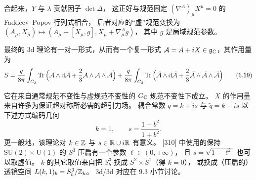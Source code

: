合起来，$Y$ 与 $\lambda$ 贡献因子 $\det\Delta$，
这正好与规范固定 $(\nabla^A)_\mu X^\mu=0$ 的 Faddeev--Popov 行列式相合，
后者对应的“虚”规范变换为 $(A_\mu,X_\mu)\mapsto(A_\mu-[X_\mu,g],X_\mu+\nabla^A_\mu g)$，
其中 $g$ 是局域规范参数。

最终的 3d 理论有一对一形式，从而有一个复一形式 $\mathcal{A}=A+iX\in\mathfrak{g}_{\mathbb{C}}$，其作用量为
\begin{equation}
S=\frac{q}{8\pi}\int_{C_3}\operatorname{Tr}\Big(\mathcal{A}\wedge\mathrm{d}\mathcal{A}+\frac{2}{3}\mathcal{A}\wedge\mathcal{A}\wedge\mathcal{A}\Big)
+\frac{\tilde q}{8\pi}\int_{C_3}\operatorname{Tr}\Big(\bar{\mathcal{A}}\wedge\mathrm{d}\bar{\mathcal{A}}
+\frac{2}{3}\bar{\mathcal{A}}\wedge\bar{\mathcal{A}}\wedge\bar{\mathcal{A}}\Big)
\tag{6.19}
\end{equation}


它在来自通常规范不变性与虚规范不变性的 $G_{\mathbb{C}}$ 规范不变性下成立。
$X$ 的作用量来自许多为保证超对称所必需的超引力场。
耦合常数 $q=k+is$ 与 $\tilde q=k-is$ 以下述方式编码几何
\begin{equation}
k=1,\qquad s=\frac{1-b^2}{1+b^2}.
\tag{6.20}
\end{equation}
更一般地，该理论对 $k\in\mathbb{Z}$ 与 $s\in\mathbb{R}\cup i\mathbb{R}$ 有意义。
[310] 中使用的保持 $\mathrm{SU}(2)\times\mathrm{U}(1)$ 的 $S^3$ 压扁有一个参数 $\ell\in(0,+\infty)$，
且 $s=\sqrt{1-\ell^2}$ 也可以取虚值。
$k$ 的其它取值来自把 $S^3_b$ 换成 $S^2\times S^1$（得 $k=0$），
或换成（压扁的）透镜空间 $L(k,1)_b=S^3_b/\mathbb{Z}_k$。
3d/3d 对应在 9.3 小节讨论。



